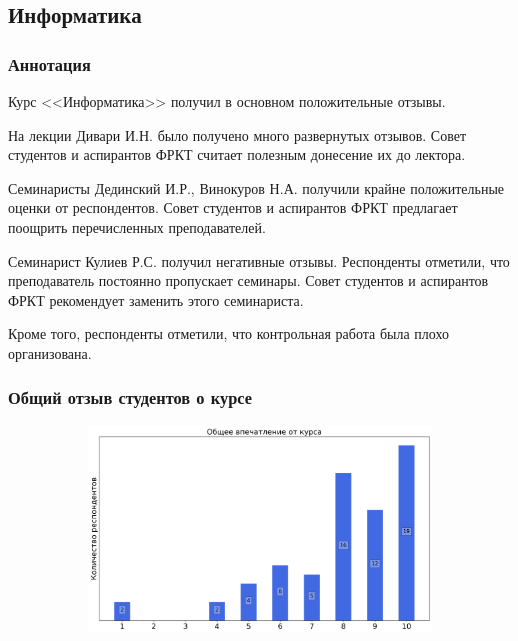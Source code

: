 \subsection{Информатика}
	
	\subsubsection{Аннотация}

        Курс <<Информатика>> получил в основном положительные отзывы.

        На лекции Дивари И.Н. было получено много развернутых отзывов. Совет студентов и аспирантов ФРКТ считает полезным донесение их до лектора.

        Семинаристы Дединский И.Р., Винокуров Н.А. получили крайне положительные оценки от респондентов. Совет студентов и аспирантов ФРКТ предлагает поощрить перечисленных преподавателей.

        Семинарист Кулиев Р.С. получил негативные отзывы. Респонденты отметили, что преподаватель постоянно пропускает семинары. Совет студентов и аспирантов ФРКТ рекомендует заменить этого семинариста.
        
        Кроме того, респонденты отметили, что контрольная работа была плохо организована.

	\subsubsection{Общий отзыв студентов о курсе}

		\begin{figure}[H]
			\centering
			\begin{subfigure}[b]{0.45\textwidth}
				\centering
				\includegraphics[width=\textwidth]{images/1 course/Информатика/general-0.png}
			\end{subfigure}
		\end{figure}

